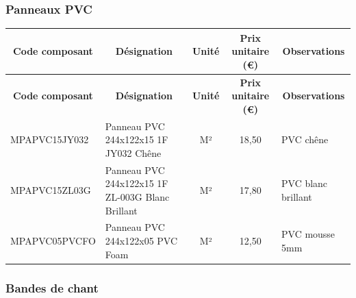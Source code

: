 \documentclass[12pt,a4paper]{article}
\begin{document}
\subsubsection{Panneaux PVC}

\begin{longtable}{|p{4cm}|p{6cm}|c|c|p{3cm}|}
\hline
\multicolumn{1}{|c|}{\textbf{Code composant}} & \multicolumn{1}{c|}{\textbf{Désignation}} & \multicolumn{1}{c|}{\textbf{Unité}} & \multicolumn{1}{c|}{\textbf{Prix unitaire (€)}} & \multicolumn{1}{c|}{\textbf{Observations}} \\
\hline
\endfirsthead
\hline
\multicolumn{1}{|c|}{\textbf{Code composant}} & \multicolumn{1}{c|}{\textbf{Désignation}} & \multicolumn{1}{c|}{\textbf{Unité}} & \multicolumn{1}{c|}{\textbf{Prix unitaire (€)}} & \multicolumn{1}{c|}{\textbf{Observations}} \\
\hline
\endhead
\hline
\endfoot
MPAPVC15JY032 & Panneau PVC 244x122x15 1F JY032 Chêne & M² & 18,50 & PVC chêne \\
MPAPVC15ZL03G & Panneau PVC 244x122x15 1F ZL-003G Blanc Brillant & M² & 17,80 & PVC blanc brillant \\
MPAPVC05PVCFO & Panneau PVC 244x122x05 PVC Foam & M² & 12,50 & PVC mousse 5mm \\
\hline
\end{longtable}

\subsubsection{Bandes de chant}
\end{document}
